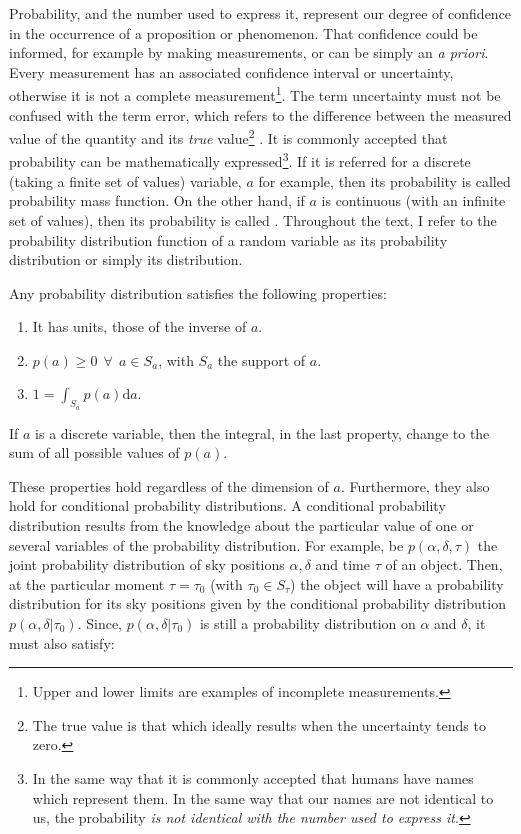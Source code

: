 Probability, and the number used to express it, represent our degree of confidence in the occurrence of a proposition or phenomenon. That confidence could be informed, for example by making measurements, or can be simply an \emph{a priori}. Every measurement has an associated confidence interval or uncertainty, otherwise it is not a complete measurement\footnote{Upper and lower limits are examples of incomplete measurements.}. The term uncertainty must not be confused with the term error, which refers to the difference between the measured value of the quantity and its \emph{true} value\footnote{The true value is that which ideally results when the uncertainty tends to zero.} \citep{GUM2008}. 
It is commonly accepted that probability can be mathematically expressed\footnote{In the same way that it is commonly accepted that humans have names which represent them. In the same way that our names are not identical to us, the probability \textit{is not identical with the number used to express it}.}. If it is referred for a discrete (taking a finite set of values) variable, $a$ for example, then its probability is called probability mass function. On the other hand, if $a$ is continuous (with an infinite set of values), then its probability is called . Throughout the text, I refer to the probability distribution function of a random variable as its probability distribution or simply its distribution.

Any probability distribution satisfies the following properties:

\begin{enumerate}[label={Property \arabic*}]
\item  It has units, those of the inverse of $a$. \label{property:1}
\item $p(a) \geq 0 \ \ \forall \ \ a\in S_a$, with $S_a$ the support of $a$. \label{property:3}
\item $1=\int_{S_a} p(a) \mathrm{d}a$. \label{property:3}
\end{enumerate}

If $a$ is a discrete variable, then the integral, in the last property, change to the sum of all possible values of $p(a)$.

These properties hold regardless of the dimension of $a$. Furthermore, they also hold for conditional probability distributions. A conditional probability distribution results from the knowledge about the particular value of one or several variables of the probability distribution. For example, be $p(\alpha,\delta,\tau)$ the joint probability distribution of sky positions $\alpha,\delta$ and time $\tau$ of an object. Then, at the particular moment $\tau=\tau_0$ (with $\tau_0 \in S_{\tau}$) the object will have a probability distribution for its sky positions given by the conditional probability distribution $p(\alpha,\delta|\tau_0)$. Since, $p(\alpha,\delta|\tau_0)$ is still a probability distribution on $\alpha$ and $\delta$, it must also satisfy:

